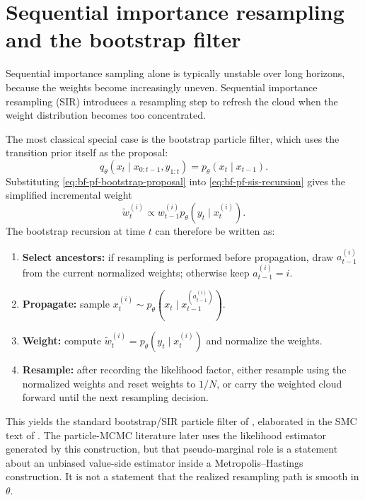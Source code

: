 \section{Sequential importance resampling and the bootstrap filter}
\label{sec:bf-pf-sir-bootstrap}

Sequential importance sampling alone is typically unstable over long horizons,
because the weights become increasingly uneven.  Sequential importance
resampling (SIR) introduces a resampling step to refresh the cloud when the
weight distribution becomes too concentrated.

The most classical special case is the bootstrap particle filter, which uses the
transition prior itself as the proposal:
\begin{equation}
\label{eq:bf-pf-bootstrap-proposal}
  q_\theta(x_t \mid x_{0:t-1}, y_{1:t})
  = p_\theta(x_t \mid x_{t-1}).
\end{equation}
Substituting \eqref{eq:bf-pf-bootstrap-proposal} into
\eqref{eq:bf-pf-sis-recursion} gives the simplified incremental weight
\begin{equation}
\label{eq:bf-pf-bootstrap-weight}
  \tilde w_t^{(i)}
  \propto w_{t-1}^{(i)} p_\theta(y_t \mid x_t^{(i)}).
\end{equation}
The bootstrap recursion at time $t$ can therefore be written as:
\begin{enumerate}[label=\textbf{Step \arabic*:}]
  \item \textbf{Select ancestors:}
    if resampling is performed before propagation, draw $a_{t-1}^{(i)}$ from
    the current normalized weights; otherwise keep $a_{t-1}^{(i)}=i$.
  \item \textbf{Propagate:}
    sample
    $x_t^{(i)} \sim p_\theta(x_t \mid x_{t-1}^{(a_{t-1}^{(i)})})$.
  \item \textbf{Weight:}
    compute
    $\tilde w_t^{(i)} = p_\theta(y_t \mid x_t^{(i)})$
    and normalize the weights.
  \item \textbf{Resample:}
    after recording the likelihood factor, either resample using the normalized
    weights and reset weights to $1/N$, or carry the weighted cloud forward
    until the next resampling decision.
\end{enumerate}
This yields the standard bootstrap/SIR particle filter of
\citet{gordon1993novel}, elaborated in the SMC text of
\citet{doucet2001sequential}.  The particle-MCMC literature
\citep{andrieu2009pseudo,andrieu2010particle} later uses the likelihood
estimator generated by this construction, but that pseudo-marginal role is a
statement about an unbiased value-side estimator inside a Metropolis--Hastings
construction.  It is not a statement that the realized resampling path is
smooth in $\theta$.

